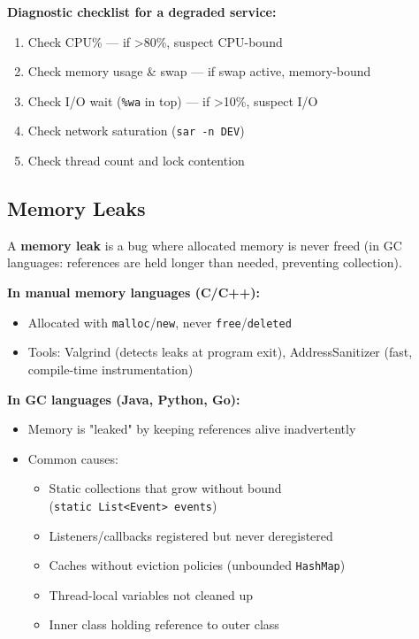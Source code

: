 \documentclass[11pt]{article}
\providecommand{\tightlist}{\setlength{\itemsep}{1pt}\setlength{\parskip}{0pt}}
\begin{document}
\textbf{Diagnostic checklist for a degraded service:}

\begin{enumerate}
\def\labelenumi{\arabic{enumi}.}
\tightlist
\item
  Check CPU\% --- if \textgreater80\%, suspect CPU-bound
\item
  Check memory usage \& swap --- if swap active, memory-bound
\item
  Check I/O wait (\texttt{\%wa} in top) --- if \textgreater10\%, suspect I/O
\item
  Check network saturation (\texttt{sar\ -n\ DEV})
\item
  Check thread count and lock contention
\end{enumerate}

\subsection{Memory Leaks}\label{memory-leaks}

A \textbf{memory leak} is a bug where allocated memory is never freed (in GC languages: references are held longer than needed, preventing collection).

\textbf{In manual memory languages (C/C++):}

\begin{itemize}
\tightlist
\item
  Allocated with \texttt{malloc}/\texttt{new}, never \texttt{free}/\texttt{deleted}
\item
  Tools: Valgrind (detects leaks at program exit), AddressSanitizer (fast, compile-time instrumentation)
\end{itemize}

\textbf{In GC languages (Java, Python, Go):}

\begin{itemize}
\tightlist
\item
  Memory is "leaked" by keeping references alive inadvertently
\item
  Common causes:

  \begin{itemize}
  \tightlist
  \item
    Static collections that grow without bound (\texttt{static\ List\textless{}Event\textgreater{}\ events})
  \item
    Listeners/callbacks registered but never deregistered
  \item
    Caches without eviction policies (unbounded \texttt{HashMap})
  \item
    Thread-local variables not cleaned up
  \item
    Inner class holding reference to outer class
  \end{itemize}
\end{itemize}
\end{document}
